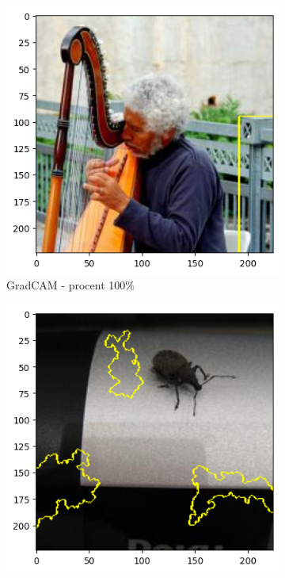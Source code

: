 \begin{figure}[h]
	\centering
	\begin{subfigure}[b]{0.3\textwidth}
		\includegraphics[width=.9\textwidth]{img/examples/appendix/n03495258_37094_gradcam}
		\caption{GradCAM - procent 100\%}
	\end{subfigure}
	\begin{subfigure}[b]{0.3\textwidth}
		\includegraphics[width=.9\textwidth]{img/examples/appendix/n02177972_27717_lime}

\end{subfigure}
\end{figure}
